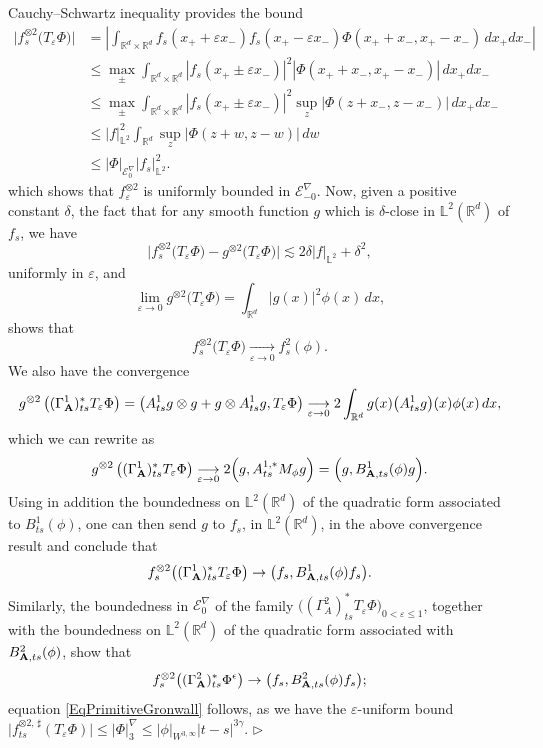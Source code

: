 \documentclass[11pt,a4paper]{amsart}
\newcommand{\RR}{\mathbb{R}}  \newcommand{\CC}{\mathbb{C}}  \newcommand{\LL}{\mathbb{L}}  \newcommand{\WW}{\mathbb{W}}
\newcommand{\mcE}{\mathcal{E}}
\renewcommand{\leq}{\leqslant}
\newcommand{\ssk}{\smallskip}
\numberwithin{equation}{section} %
\newenvironment{Dem}{%
    \begin{list}{\hspace{0.5cm}{\sc Proof --}}{%
        \setlength{\topsep}{0pt}%
        \setlength{\leftmargin}{0pt}%
        \setlength{\rightmargin}{0pt}%
        \setlength{\listparindent}{0pt}%
        \setlength{\itemindent}{0pt}%
        \setlength{\parsep}{0pt}%
        \addtolength{\leftmargin}{20pt}%
        \addtolength{\rightmargin}{0pt}%
    } \item }{\hfill{\space $\rhd$}\end{list}\smallskip}
\begin{document}
\begin{Dem}
\ssk
 Cauchy--Schwartz inequality provides the  bound
\begin{equation*}
\begin{split}
\Big|f^{\otimes 2}_s \big(T_\varepsilon \Phi\big)\Big| &= \left|\int_{\RR^d \times \RR^d} f_s(x_+ + \varepsilon x_-) f_s(x_+ - \varepsilon x_-) \Phi(x_+ +  x_-,x_+ -  x_-)\,dx_+ dx_- \right|  \\
&\leq \max_\pm \int_{\RR^d \times \RR^d} |f_s(x_+ \pm \varepsilon x_-)|^2  |\Phi(x_+ +  x_-,x_+ -  x_-)|\,dx_+ dx_- \\
&\leq  \max_\pm   \int_{\RR^d \times \RR^d} |f_s(x_+ \pm \varepsilon x_-)|^2  \sup_z |\Phi(z +  x_-,z -  x_-)|\,dx_+ dx_- \\
&\leq |f|_{\LL^2}^2 \int_{\RR^d } \sup_{z}| \Phi(z +  w,z -  w)|\,dw  \\
&\leq  |\Phi|_{\mcE^\nabla_0} \big|f_s\big|_{\LL^2}^2. 
\end{split}
\end{equation*}
which shows that $f^{\otimes 2}_\varepsilon$ is uniformly bounded in $\mcE^\nabla_{-0}$.
Now, given a positive constant $\delta$, the fact that for any smooth function $g$ which is $\delta$-close in $\LL^2(\RR^d)$ of $f_s$, we have
$$ 
\Big|f^{\otimes 2}_s \big(T_\varepsilon \Phi\big)- g^{\otimes 2} \big(T_\varepsilon \Phi\big) \Big| \lesssim 2\delta |f|_{\LL^2} + \delta^2,
$$ 
uniformly in $\varepsilon$, and
$$
\lim_{\varepsilon\to 0} g^{\otimes 2} \big(T_\varepsilon \Phi) = \int_{\RR^d }\big|g(x)\big|^2 \phi (x)\,dx,
$$
shows that 
$$
f^{\otimes 2}_s \big(T_\varepsilon \Phi\big) \underset{\varepsilon\to 0}{\longrightarrow} f_s^2(\phi). 
$$
We also have the convergence 
$$
g^{\otimes 2} \left((\Gamma_{\bfA}^1)^*_{ts} T_\varepsilon \Phi\right) = \big( A^1_{ts} g \otimes g + g \otimes A^1_{ts} g, T_\varepsilon \Phi \big) \underset{\varepsilon\to 0}{\longrightarrow} 2 \int_{\RR^d } g(x) \big(A^1_{ts}g\big)(x) \phi (x)\, dx,
$$
which we can rewrite as
$$
g^{\otimes 2} \left((\Gamma_{\bf A}^1)^*_{ts} T_\varepsilon \Phi\right) \underset{\varepsilon\to 0}{\longrightarrow} 2\Big( g , A^{1,*}_{ts} M_\phi g \Big) = \Big(g,B^1_{{\bf A},ts}(\phi)g\Big).
$$
Using in addition the boundedness on $\LL^2(\RR^d)$ of the quadratic form associated to $B^1_{ts}(\phi)$, one can then send $g$ to $f_s$, in $\LL^2(\RR^d)$, in the above convergence result and conclude that
$$
f^{\otimes 2}_s \big((\Gamma_{\bf A}^1)_{ts}^* T_\varepsilon \Phi\big) \to \big( f_s , B^1_{{\bf A},ts}(\phi) f_s\big). 
$$
Similarly, the boundedness in $\mcE^\nabla_0$ of the family $\big((\Gamma_A^2)^*_{ts}  T_\varepsilon \Phi\big)_{0<\varepsilon\leq 1}$, together with the boundedness on $\LL^2(\RR^d)$ of the quadratic form associated with $B^2_{{\bf A},ts}(\phi)$, show that 
$$
f^{\otimes 2}_s \big((\Gamma_{\bf A}^2)_{ts}^*\Phi^\epsilon\big) \to \big( f_s , B^2_{{\bf A},ts}(\phi) f_s\big);
$$
equation \eqref{EqPrimitiveGronwall} follows, as we have the $\varepsilon$-uniform bound $\Big|f^{\otimes 2,\,\sharp}_{ts}(T_\varepsilon \Phi)\Big| \leq  \big|\Phi\big|_{3}^\nabla \leq \big|\phi\big|_{W^{3,\infty}}|t-s|^{3\gamma}$.  
\end{Dem} 
\end{document}

